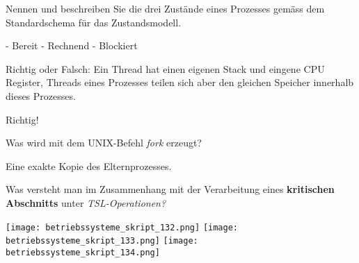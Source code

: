 \documentclass{article}
\begin{document}
\begin{tcolorbox}[colback=white!10!white,colframe=lightgray!75!black,
  savelowerto=\jobname_ex.tex]

\begin{center}
Nennen und beschreiben Sie die drei Zustände eines Prozesses gemäss dem Standardschema für das Zustandsmodell.

\end{center}

\tcblower

\justifying
- Bereit
- Rechnend
- Blockiert

\end{tcolorbox}
\begin{tcolorbox}[colback=white!10!white,colframe=lightgray!75!black,
  savelowerto=\jobname_ex.tex]

\begin{center}
Richtig oder Falsch: Ein Thread hat einen eigenen Stack und eingene CPU Register, Threads eines Prozesses teilen sich aber den gleichen Speicher innerhalb dieses Prozesses.

\end{center}

\tcblower

\justifying
Richtig!

\end{tcolorbox}
\begin{tcolorbox}[colback=white!10!white,colframe=lightgray!75!black,
  savelowerto=\jobname_ex.tex]

\begin{center}
Was wird mit dem UNIX-Befehl 
\textit{fork
} erzeugt?

\end{center}

\tcblower

\justifying
Eine exakte Kopie des Elternprozesses.

\end{tcolorbox}
\begin{tcolorbox}[colback=white!10!white,colframe=lightgray!75!black,
  savelowerto=\jobname_ex.tex]

\begin{center}
Was versteht man im Zusammenhang mit der Verarbeitung eines 
\textbf{kritischen Abschnitts
} unter 
\textit{TSL-Operationen?
}
\end{center}

\tcblower

\justifying
\texttt{[image: betriebssysteme\_skript\_132.png]}
\texttt{[image: betriebssysteme\_skript\_133.png]}
\texttt{[image: betriebssysteme\_skript\_134.png]}

\end{tcolorbox}
\end{document}
